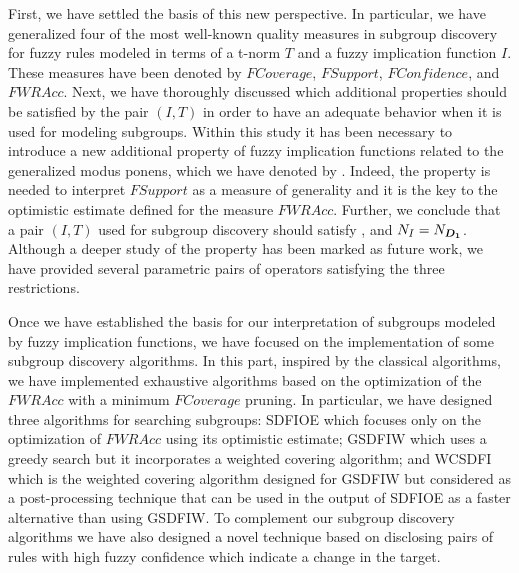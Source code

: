 First, we have settled the basis of this new perspective. In particular, we have generalized four of the most well-known quality measures in subgroup discovery for fuzzy rules modeled in terms of a t-norm $T$ and a fuzzy implication function $I$. These measures have been denoted by $FCoverage$, $FSupport$, $FConfidence$, and $FWRAcc$. Next, we have thoroughly discussed which additional properties should be satisfied by the pair $(I,T)$ in order to have an adequate behavior when it is used for modeling subgroups. Within this study it has been necessary to introduce a new additional property of fuzzy implication functions related to the generalized modus ponens, which we have denoted by \MTC. Indeed, the property \MTC is needed to interpret $FSupport$ as a measure of generality and it is the key to the optimistic estimate defined for the measure $FWRAcc$. Further, we conclude that a pair $(I,T)$ used for subgroup discovery should satisfy \TC, \MTC and $N_I=N_{\bm{D_1}}$. Although a deeper study of the property \MTC has been marked as future work, we have provided several parametric pairs of operators satisfying the three restrictions.

Once we have established the basis for our interpretation of subgroups modeled by fuzzy implication functions, we have focused on the implementation of some subgroup discovery algorithms. In this part, inspired by the classical algorithms, we have implemented exhaustive algorithms based on the optimization of the $FWRAcc$ with a minimum $FCoverage$ pruning. In particular, we have designed three algorithms for searching subgroups: SDFIOE which focuses only on the optimization of $FWRAcc$ using its optimistic estimate; GSDFIW which uses a greedy search but it incorporates a weighted covering algorithm; and WCSDFI which is the weighted covering algorithm designed for GSDFIW but considered as a post-processing technique that can be used in the output of SDFIOE as a faster alternative than using GSDFIW. To complement our subgroup discovery algorithms we have also designed a novel technique based on disclosing pairs of rules with high fuzzy confidence which indicate a change in the target.

